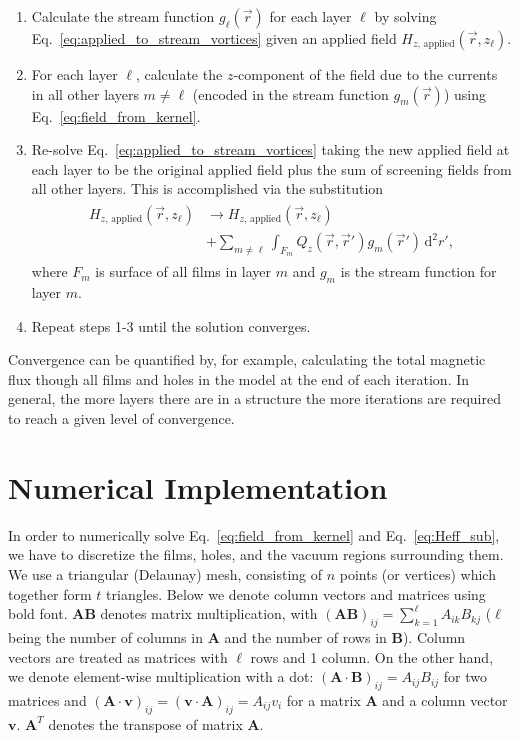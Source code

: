\documentclass[final,3p,times,twocolumn]{elsarticle}
\begin{document}
\begin{enumerate}
    \item{
        Calculate the stream function $g_\ell(\vec{r})$ for each layer $\ell$ by solving Eq.~\ref{eq:applied_to_stream_vortices} given an applied field $H_{z,\,\mathrm{applied}}(\vec{r}, z_\ell)$.
    }
    \item{
        For each layer $\ell$, calculate the $z$-component of the field due to the currents in all other layers $m\neq\ell$ (encoded in the stream function $g_m(\vec{r})$)
        using Eq.~\ref{eq:field_from_kernel}.
    }
    \item{
        Re-solve Eq.~\ref{eq:applied_to_stream_vortices} taking the new applied field at each layer to be the original applied field plus the sum of screening fields from all other layers. This is accomplished via the substitution
        \begin{align}
        \begin{split}
            H_{z,\,\mathrm{applied}}(\vec{r}, z_\ell)
            &\to H_{z,\,\mathrm{applied}}(\vec{r}, z_\ell)\\
            &+ \sum_{m\neq\ell}
            \int_{F_m} Q_z(\vec{r},\vec{r}')g_m(\vec{r}')\,\mathrm{d}^2r',
            \label{eq:iterative}
        \end{split}
        \end{align}
        where $F_m$ is surface of all films in layer $m$ and $g_m$ is the stream function for layer $m$.
    }
    \item{
        Repeat steps 1-3 until the solution converges.
    }
\end{enumerate}

Convergence can be quantified by, for example, calculating the total magnetic flux though all films and holes in the model at the end of each iteration. In general, the more layers there are in a structure the more iterations are  required to reach a given level of convergence.

\section{Numerical Implementation}
\label{section:implementation}

In order to numerically solve Eq.~\ref{eq:field_from_kernel} and Eq.~\ref{eq:Heff_sub}, we have to discretize the films, holes, and the vacuum regions surrounding them. We use a triangular
(Delaunay) mesh, consisting of $n$ points (or vertices)
which together form $t$ triangles. Below we denote column vectors and matrices using bold font. $\mathbf{A}\mathbf{B}$
denotes matrix multiplication, with $(\mathbf{A}\mathbf{B})_{ij}=\sum_{k=1}^\ell A_{ik}B_{kj}$
($\ell$ being the number of columns in $\mathbf{A}$ and the number of rows in $\mathbf{B}$). Column vectors are treated as matrices with $\ell$ rows and 1 column. On the other hand, we denote element-wise multiplication with a dot: $(\mathbf{A}\cdot\mathbf{B})_{ij}=A_{ij}B_{ij}$ for two matrices
and $(\mathbf{A}\cdot\mathbf{v})_{ij}=(\mathbf{v}\cdot\mathbf{A})_{ij}=A_{ij}v_{i}$ for a matrix $\mathbf{A}$ and a column vector $\mathbf{v}$. $\mathbf{A}^T$ denotes the transpose of matrix $\mathbf{A}$.
\end{document}
